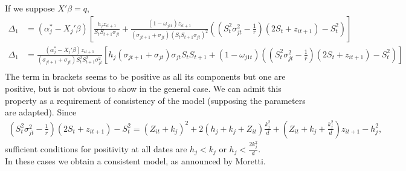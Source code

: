 If we suppose $X'\beta=q$,
\begin{align*}
	\Delta_{1}&= (\alpha_{j}^{*}-X_{j}'\beta)\left[\frac{h_{j}z_{i t+1}}{S_{t}S_{t+1}\sigma_{j t}}+\frac{(1-\omega_{j 1 t})z_{i t+1}}{(\sigma_{j t+1}+\sigma_{j t})(S_{t}S_{t+1}\sigma_{j t})^{2}}\left(\left(S_{t}^{2}\sigma_{j t}^{2}-\frac{1}{r}\right)(2S_{t}+z_{i t+1})-S_{t}^{2}\right)\right]\\
	\Delta_{1}&= \frac{(\alpha_{j}^{*}-X_{j}'\beta)z_{i t+1}}{(\sigma_{j t+1}+\sigma_{j t})S_{t}^{2}S_{t+1}^{2}\sigma_{j t}^{2}}\left[h_{j}(\sigma_{j t+1}+\sigma_{j t})\sigma_{j t}S_{t}S_{t+1}+(1-\omega_{j 1 t})\left(\left(S_{t}^{2}\sigma_{j t}^{2}-\frac{1}{r}\right)(2S_{t}+z_{i t+1})-S_{t}^{2}\right)\right]\\
\end{align*}	
The term in brackets seems to be positive as all its components but one are positive, but is not obvious to show in the general case. We can admit this property as a requirement of consistency of the model (supposing the parameters are adapted). Since
\begin{align*}
	\left(S_{t}^{2}\sigma_{j t}^{2}-\frac{1}{r}\right)(2S_{t}+z_{i t+1})-S_{t}^{2}=(Z_{i t}+k_{j})^{2}+2(h_{j}+k_{j}+Z_{i t})\frac{k_{j}^{2}}{d}+(Z_{i t}+k_{j}+\frac{k_{j}^{2}}{d})z_{i t+1}-h_{j}^{2},
\end{align*}
sufficient conditions for positivity at all dates are $h_{j}<k_{j}$ or $h_{j}<\frac{2k_{j}^{2}}{d}$.\\
\medspace
In these cases we obtain a consistent model, as announced by Moretti.

